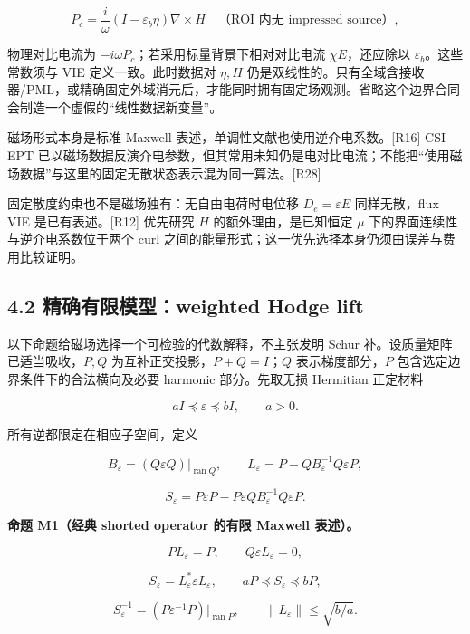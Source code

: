 \documentclass[11pt,a4paper]{article}
\begin{document}
\[
P_c=\frac{i}{\omega}(I-\varepsilon_b\eta)\nabla\times H
\quad\text{（ROI 内无 impressed source）},
\]

物理对比电流为 \(-i\omega P_c\)；若采用标量背景下相对对比电流
\(\chi E\)，还应除以 \(\varepsilon_b\)。这些常数须与 VIE
定义一致。此时数据对 \(\eta,H\)
仍是双线性的。只有全域含接收器/PML，或精确固定外域消元后，才能同时拥有固定场观测。省略这个边界合同会制造一个虚假的``线性数据新变量''。

磁场形式本身是标准 Maxwell 表述，单调性文献也使用逆介电系数。{[}R16{]}
CSI-EPT
已以磁场数据反演介电参数，但其常用未知仍是电对比电流；不能把``使用磁场数据''与这里的固定无散状态表示混为同一算法。{[}R28{]}

固定散度约束也不是磁场独有：无自由电荷时电位移 \(D_e=\varepsilon E\)
同样无散，flux VIE 是已有表述。{[}R12{]} 优先研究 \(H\)
的额外理由，是已知恒定 \(\mu\) 下的界面连续性与逆介电系数位于两个 curl
之间的能量形式；这一优先选择本身仍须由误差与费用比较证明。

\hypertarget{ux7cbeux786eux6709ux9650ux6a21ux578bweighted-hodge-lift}{%
\subsection{4.2 精确有限模型：weighted Hodge
lift}\label{ux7cbeux786eux6709ux9650ux6a21ux578bweighted-hodge-lift}}

以下命题给磁场选择一个可检验的代数解释，不主张发明 Schur
补。设质量矩阵已适当吸收，\(P,Q\) 为互补正交投影，\(P+Q=I\)；\(Q\)
表示梯度部分，\(P\) 包含选定边界条件下的合法横向及必要 harmonic
部分。先取无损 Hermitian 正定材料

\[
aI\preceq\varepsilon\preceq bI,\qquad a>0.
\]

所有逆都限定在相应子空间，定义

\[
B_\varepsilon=(Q\varepsilon Q)|_{\operatorname{ran}Q},
\qquad
L_\varepsilon=P-QB_\varepsilon^{-1}Q\varepsilon P,
\]

\[
S_\varepsilon=P\varepsilon P
-P\varepsilon Q B_\varepsilon^{-1}Q\varepsilon P.
\]

\textbf{命题 M1（经典 shorted operator 的有限 Maxwell 表述）。}

\[
PL_\varepsilon=P,\qquad Q\varepsilon L_\varepsilon=0,
\]

\[
S_\varepsilon=L_\varepsilon^*\varepsilon L_\varepsilon,
\qquad aP\preceq S_\varepsilon\preceq bP,
\]

\[
S_\varepsilon^{-1}=(P\varepsilon^{-1}P)|_{\operatorname{ran}P},
\qquad \|L_\varepsilon\|\le\sqrt{b/a}.
\]
\end{document}
